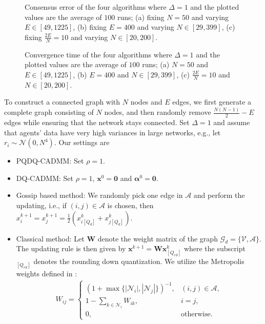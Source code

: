 \documentclass[journal]{IEEEtran}
\newcommand{\nn}{\nonumber}
\begin{document}
 \begin{figure*}[ht]
	\centering
	\caption{Consensus error of the four algorithms where $\Delta = 1$ and the plotted values are the average of $100$ runs; (a) fixing $N=50$ and varying $E\in[49, 1225]$, (b) fixing $E=400$ and varying $N\in[29, 399]$, (c) fixing $\frac{2E}{N}=10$ and varying $N\in[20,200]$.}
	\label{fig:cerr}
\end{figure*}
\begin{figure*}[ht]
	\centering
	\caption{Convergence time of the four algorithms where $\Delta = 1$ and the plotted values are the average of $100$ runs; (a) $N=50$ and $E\in[49, 1225]$, (b) $E=400$ and $N\in[29, 399]$, (c) $\frac{2E}{N}=10$ and $N\in[20,200]$.}
	\label{fig:ctime}
\end{figure*}
To construct a connected graph with $N$ nodes and $E$ edges, we first generate a complete graph consisting of $N$ nodes, and then randomly remove $\frac{N(N-1)}{2}-E$ edges while ensuring that the network stays connected. Set $\Delta = 1$ and assume that agents' data have very high variances in large networks, e.g., let $r_i\sim\mathcal{N}(0,N^4)$. Our settings are\begin{itemize}
\item PQDQ-CADMM: Set $\rho = 1$.
\item DQ-CADMM: Set $\rho = 1$, $\bm x^0 =\bm 0$ and $\bm\alpha^0=\bm 0$.
\item Gossip based method: We randomly pick one edge in $\mathcal{A}$ and perform the updating, i.e., if $(i,j)\in\mathcal{A}$ is chosen, then $x^{k+1}_i = x^{k+1}_j =\frac{1}{2}(x^{k}_{i[Q_d]}+x^k_{j[Q_d]})$. 
\item Classical method: Let $\bm W$ denote the weight matrix of the graph $\mathcal{G}_d=\{\mathcal{V},\mathcal{A}\}$. The updating rule is then given by $\bm x^{k+1} = \bm W \bm x^k_{[Q_{rd}]}$ where the subscript $_{[Q_{rd}]}$ denotes the rounding down quantization. We utilize the Metropolis weights defined in \cite{Xiao2005}: 
\begin{equation}
\begin{aligned}
W_{ij} =
\begin{cases}
(1+\max\{|\mathcal{N}_i|,|\mathcal{N}_j|\})^{-1}, &(i,j)\in\mathcal{A},\\
1-\sum_{k\in\mathcal{N}_i}W_{ik}, &i = j,\\
0, &\text{otherwise}.\nn
\end{cases}
\end{aligned}
\end{equation}
\end{itemize}
\end{document}
